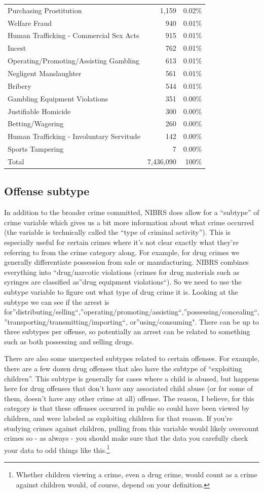 \documentclass[
  12pt,
  openany]{book}
\begin{document}
\begin{longtable}[]{@{}lrr@{}}
Purchasing Prostitution & 1,159 & 0.02\%\tabularnewline
Welfare Fraud & 940 & 0.01\%\tabularnewline
Human Trafficking - Commercial Sex Acts & 915 & 0.01\%\tabularnewline
Incest & 762 & 0.01\%\tabularnewline
Operating/Promoting/Assisting Gambling & 613 & 0.01\%\tabularnewline
Negligent Manslaughter & 561 & 0.01\%\tabularnewline
Bribery & 544 & 0.01\%\tabularnewline
Gambling Equipment Violations & 351 & 0.00\%\tabularnewline
Justifiable Homicide & 300 & 0.00\%\tabularnewline
Betting/Wagering & 260 & 0.00\%\tabularnewline
Human Trafficking - Involuntary Servitude & 142 & 0.00\%\tabularnewline
Sports Tampering & 7 & 0.00\%\tabularnewline
Total & 7,436,090 & 100\%\tabularnewline
\bottomrule
\end{longtable}

\hypertarget{offense-subtype}{%
\subsection{Offense subtype}\label{offense-subtype}}

In addition to the broader crime committed, NIBRS does allow for a ``subtype'' of crime variable which gives us a bit more information about what crime occurred (the variable is technically called the ``type of criminal activity''). This is especially useful for certain crimes where it's not clear exactly what they're referring to from the crime category along. For example, for drug crimes we generally differentiate possession from sale or manufacturing. NIBRS combines everything into ``drug/narcotic violations (crimes for drug materials such as syringes are classified as''drug equipment violations``). So we need to use the subtype variable to figure out what type of drug crime it is. Looking at the subtype we can see if the arrest is for''distributing/selling``,''operating/promoting/assisting``,''possessing/concealing``,''transporting/transmitting/importing``, or''using/consuming". There can be up to three subtypes per offense, so potentially an arrest can be related to something such as both possessing and selling drugs.

There are also some unexpected subtypes related to certain offenses. For example, there are a few dozen drug offenses that also have the subtype of ``exploiting children''. This subtype is generally for cases where a child is abused, but happens here for drug offenses that don't have any associated child abuse (or for some of them, doesn't have any other crime at all) offense. The reason, I believe, for this category is that these offenses occurred in public so could have been viewed by children, and were labeled as exploiting children for that reason. If you're studying crimes against children, pulling from this variable would likely overcount crimes so - as always - you should make sure that the data you carefully check your data to odd things like this.\footnote{Whether children viewing a crime, even a drug crime, would count as a crime against children would, of course, depend on your definition.}
\end{document}
